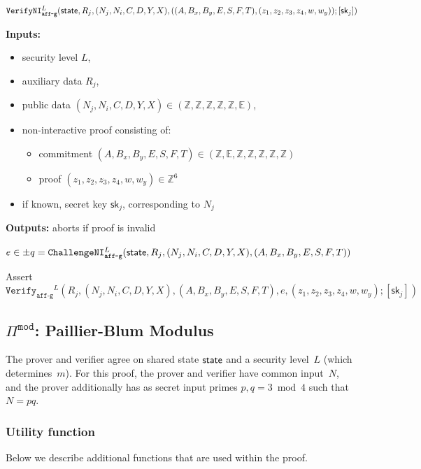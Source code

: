 \documentclass[11pt]{article}
\newenvironment{inlineAlgorithm}{}{}
\newcommand{\algoName}[1]{#1 \par}
\newcommand{\algoInputsList}[1]{
    {\small \bf Inputs:} 
        \begin{itemize}[noitemsep,topsep=0pt]
            #1
        \end{itemize}
}
\newcommand{\algoOutputs}[1]{
    {\small \bf Outputs:} #1 \par
}
\def\state{{\sf state}}
\newcommand{\proof}[1]{\ensuremath{\Pi^{\mathtt{#1}}}}
\newcommand{\challengeni}[1]{\ensuremath{\mathtt{ChallengeNI}_{\mathtt{#1}}}}
\newcommand{\verify}[1]{\ensuremath{\mathtt{Verify}_{\mathtt{#1}}}}
\newcommand{\verifyni}[1]{\ensuremath{\mathtt{VerifyNI}_{\mathtt{#1}}}}
\newcommand{\sk}{\textsf{sk}}
\newcommand{\E}{\mathbb{E}}
\newcommand{\Z}{\mathbb{Z}}
\newcommand{\?}[1]{\stackrel{?}{#1}}
\begin{document}
\begin{description}
\item
\begin{inlineAlgorithm}
\algoName{$\verifyni{aff\mbox{-}g}^L(
    \state,
    R_j,
    (N_j, N_i, C, D, Y, X),
    (
        (A, B_x, B_y, E, S, F, T),
        (z_1, z_2, z_3, z_4, w, w_y)
    );
    [\sk_j]
)$}
\algoInputsList{
    \item security level $L$,
    \item auxiliary data $R_j$,
    \item public data $(N_j, N_i, C, D, Y, X) \in (\Z, \Z, \Z, \Z, \Z, \E)$,
    \item non-interactive proof consisting of:
        \begin{itemize}
        \item commitment $(A, B_x, B_y, E, S, F, T) \in (\Z, \E, \Z, \Z, \Z, \Z, \Z)$
        \item proof $(z_1, z_2, z_3, z_4, w, w_y) \in \Z^6$
        \end{itemize}
    \item if known, secret key $\sk_j$, corresponding to $N_j$
}
\algoOutputs{aborts if proof is invalid}
\begin{algorithmic}[1]
\State $e \in \pm q = \challengeni{aff\mbox{-}g}^L(
    \state,
    R_j,
    (N_j, N_i, C, D, Y, X),
    (A, B_x, B_y, E, S, F, T)
)$

\Comment{$q = |\E|$}
\State Assert $\verify{aff\mbox{-}g}^L(
    R_j,
    (N_j, N_i, C, D, Y, X),
    (A, B_x, B_y, E, S, F, T),
    e,
    (z_1, z_2, z_3, z_4, w, w_y);
    [\sk_j]
)$
\end{algorithmic}
\end{inlineAlgorithm}

\end{description}

\subsection{$\proof{mod}$: Paillier-Blum Modulus}
The prover and verifier agree on shared state $\state$ and a security level~$L$ (which determines~$m$). For this proof, the prover and verifier have common input~$N$, and the prover additionally has as secret input primes $p, q=3 \bmod 4$ such that~$N=pq$.

\subsubsection{Utility function}
Below we describe additional functions that are used within the proof.
\end{document}
